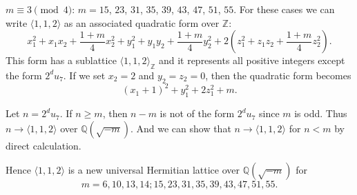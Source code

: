 \documentclass[a4paper,10pt,reqno]{amsart}
\begin{document}
{} $m \equiv 3 \pmod{4}$: $m = 15$, $23$, $31$, $35$, $39$, $43$, $47$, $51$, $55$.
For these cases we can write ${\langle {1,1,2} \rangle}$ as an associated quadratic form over ${\mathbb{Z}}$:
\[
    x_1^2+x_1x_2+\frac{1+m}4x_2^2 + y_1^2+y_1y_2+\frac{1+m}4y_2^2 +
    2\left(z_1^2+z_1z_2+\frac{1+m}4z_2^2\right).
\]
This form has a sublattice ${\langle {1,1,2} \rangle}_{\mathbb{Z}}$ and it represents all positive integers except the form
$2^{d}u_7$. If we set $x_2=2$ and $y_2 = z_2=0$, then the quadratic form becomes
\[
    (x_1+1)^2 + y_1^2 + 2z_1^2 + m.
\]

Let  $n=2^{d} u_7$. If $n \ge m$, then $n-m$ is not of the form $2^{d}u_7$ since $m$ is odd. Thus
$n \to {\langle {1,1,2} \rangle}$ over ${\mathbb{Q}(\sqrt{{-m}})}$. And we can show that $n \to {\langle {1,1,2} \rangle}$ for $n < m$ by direct
calculation.

Hence ${\langle {1,1,2} \rangle}$ is a new universal Hermitian lattice over ${\mathbb{Q}(\sqrt{{-m}})}$ for
\[
    m = 6, 10, 13, 14; 15, 23, 31, 35, 39, 43, 47, 51, 55.
\]
\end{document}
